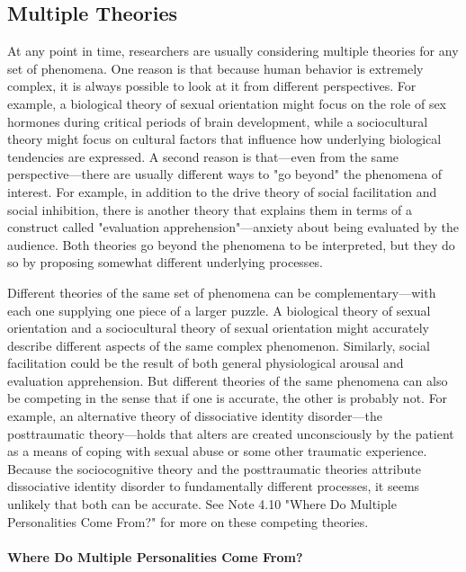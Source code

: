 \subsection{Multiple Theories}

At any point in time, researchers are usually considering multiple theories for any set of phenomena. One reason is that because human behavior is extremely complex, it is always possible to look at it from different perspectives. For example, a biological theory of sexual orientation might focus on the role of sex hormones during critical periods of brain development, while a sociocultural theory might focus on cultural factors that influence how underlying biological tendencies are expressed. A second reason is that---even from the same perspective---there are usually different ways to "go beyond" the phenomena of interest. For example, in addition to the drive theory of social facilitation and social inhibition, there is another theory that explains them in terms of a construct called "evaluation apprehension"---anxiety about being evaluated by the audience. Both theories go beyond the phenomena to be interpreted, but they do so by proposing somewhat different underlying processes.

Different theories of the same set of phenomena can be complementary---with each one supplying one piece of a larger puzzle. A biological theory of sexual orientation and a sociocultural theory of sexual orientation might accurately describe different aspects of the same complex phenomenon. Similarly, social facilitation could be the result of both general physiological arousal and evaluation apprehension. But different theories of the same phenomena can also be competing in the sense that if one is accurate, the other is probably not. For example, an alternative theory of dissociative identity disorder---the posttraumatic theory---holds that alters are created unconsciously by the patient as a means of coping with sexual abuse or some other traumatic experience. Because the sociocognitive theory and the posttraumatic theories attribute dissociative identity disorder to fundamentally different processes, it seems unlikely that both can be accurate. See Note 4.10 "Where Do Multiple Personalities Come From?" for more on these competing theories.


\paragraph{Where Do Multiple Personalities Come From?}


